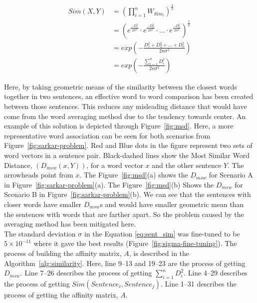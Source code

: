 \begin{equation}\label{eq:sent_sim}
    \begin{split}
        Sim(X,Y)
        &=  \left(
                \prod_{i=1}^nW_{Sim_i}
            \right)^{\frac{1}{n}}\\
        &=  \left(
                e^{\frac{-D_1^2}{2\sigma^2}}\cdot
                e^{\frac{-D_2^2}{2\sigma^2}}\cdot
                    \ldots \cdot
                e^{\frac{-D_n^2}{2\sigma^2}}
            \right)^\frac{1}{n}\\
        &=  exp\left(
                -\frac{D_1^2+D_2^2+\ldots+D_n^2}{2n\sigma^2}
            \right)\\
        &=  exp\left(
                -\frac{\sum_{i=1}^nD_i^2}{2n\sigma^2}
            \right)
    \end{split}
\end{equation}

Here, by taking geometric means of the similarity between the closest words together in two sentences, an effective word to word comparison has been created between those sentences. This reduces any misleading distance that would have come from the word averaging method due to the tendency towards center. An example of this solution is depicted through Figure~\ref{fig:msd}. Here, a more representative word association can be seen for both scenarios from Figure~\ref{fig:sarkar-problem}. Red and Blue dots in the figure represent two sets of word vectors in a sentence pair. Black-dashed lines show the Most Similar Word Distance, $(D_{msw}(x,Y))$, for a word vector $x$ and the other sentence $Y$. The arrowheads point from $x$. The Figure~\ref{fig:msd}(a) shows the $D_{msw}$ for Scenario A in Figure~\ref{fig:sarkar-problem}(a). The Figure~\ref{fig:msd}(b) Shows the $D_{msw}$ for Scenario B in Figure~\ref{fig:sarkar-problem}(b). We can see that the sentences with closer words have smaller $D_{msw}$s and would have smaller geometric mean than the sentences with words that are farther apart. So the problem caused by the averaging method has been mitigated here.\\

The standard deviation $\sigma$ in the Equation \ref{eq:sent_sim} was fine-tuned to be $5\times10^{-11}$ where it gave the best results (Figure~\ref{fig:sigma-fine-tuning}). The process of building the affinity matrix, $A$, is described in the Algorithm~\ref{alg:similarity}. Here, line 9--13 and 19--23 are the process of getting $D_{msw}$. Line 7--26 describes the process of getting $\sum^n_{i=1}D_i^2$. Line 4--29 describes the process of getting $Sim(Sentence_i,Sentence_j)$. Line 1--31 describes the process of getting the affinity matrix, $A$.

